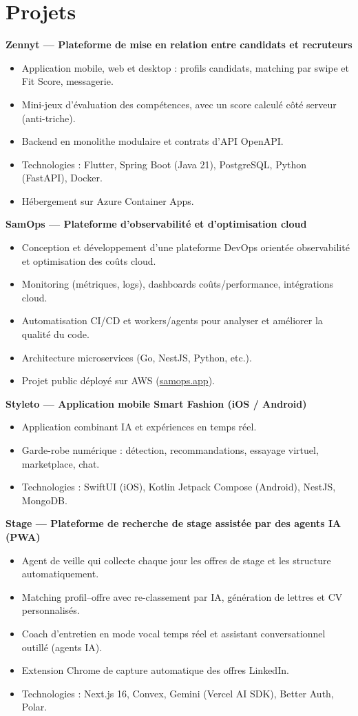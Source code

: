 \documentclass[10.5pt,a4paper]{article}
\newcommand{\project}[1]{\needspace{5\baselineskip}\noindent\textbf{#1}\par\vspace{2pt}}
\begin{document}
\section*{Projets}
\project{Zennyt — Plateforme de mise en relation entre candidats et recruteurs}
\begin{itemize}
  \item Application mobile, web et desktop : profils candidats, matching par swipe et Fit Score, messagerie.
  \item Mini-jeux d’évaluation des compétences, avec un score calculé côté serveur (anti-triche).
  \item Backend en monolithe modulaire et contrats d’API OpenAPI.
  \item Technologies : Flutter, Spring Boot (Java 21), PostgreSQL, Python (FastAPI), Docker.
  \item Hébergement sur Azure Container Apps.
\end{itemize}
\vspace{3pt}
\project{SamOps — Plateforme d’observabilité et d’optimisation cloud}
\begin{itemize}
  \item Conception et développement d’une plateforme DevOps orientée observabilité et optimisation des coûts cloud.
  \item Monitoring (métriques, logs), dashboards coûts/performance, intégrations cloud.
  \item Automatisation CI/CD et workers/agents pour analyser et améliorer la qualité du code.
  \item Architecture microservices (Go, NestJS, Python, etc.).
  \item Projet public déployé sur AWS (\href{https://samops.app}{samops.app}).
\end{itemize}
\vspace{3pt}
\project{Styleto — Application mobile Smart Fashion (iOS / Android)}
\begin{itemize}
  \item Application combinant IA et expériences en temps réel.
  \item Garde-robe numérique : détection, recommandations, essayage virtuel, marketplace, chat.
  \item Technologies : SwiftUI (iOS), Kotlin Jetpack Compose (Android), NestJS, MongoDB.
\end{itemize}
\vspace{3pt}
\project{Stage — Plateforme de recherche de stage assistée par des agents IA (PWA)}
\begin{itemize}
  \item Agent de veille qui collecte chaque jour les offres de stage et les structure automatiquement.
  \item Matching profil–offre avec re-classement par IA, génération de lettres et CV personnalisés.
  \item Coach d’entretien en mode vocal temps réel et assistant conversationnel outillé (agents IA).
  \item Extension Chrome de capture automatique des offres LinkedIn.
  \item Technologies : Next.js 16, Convex, Gemini (Vercel AI SDK), Better Auth, Polar.
\end{itemize}
\end{document}
